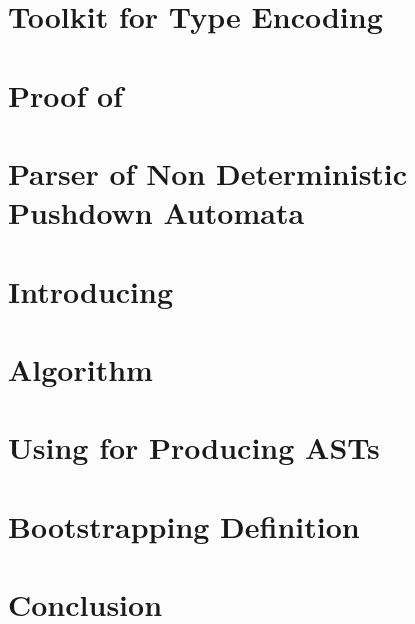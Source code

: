 \documentclass[a4paper,USenglish]{lipics}
\begin{document}
\section{Toolkit for Type Encoding}
\label{Section:toolkit}


\section{Proof of }
\label{Section:proof}


\section{Parser of Non Deterministic Pushdown Automata}
\label{Section:bridge}


\section{Introducing \Self}
\label{Section:fajita}


\section{Algorithm}
\label{Section:algorithm}


\section{Using \Self for Producing ASTs}
\label{Section:AST}


\section{Bootstrapping Definition}
\label{Section:bootstrapping}


\section{Conclusion}
\label{Section:zz}


\small
%

\end{document}
